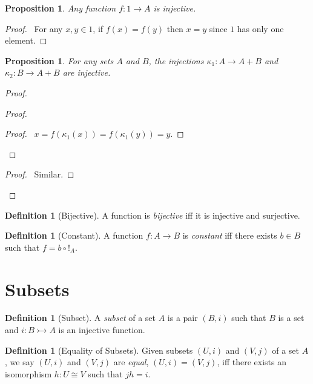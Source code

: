 \documentclass{book}
\let\qed\relax
\newtheorem{prop}[ax]{Proposition}
\theoremstyle{definition}
\newtheorem{df}[ax]{Definition}
\begin{document}
\begin{prop}
Any function $f : 1 \rightarrow A$ is injective.
\end{prop}

\begin{proof}
\pf\ For any $x,y \in 1$, if $f(x) = f(y)$ then $x = y$ since $1$ has only one element. \qed
\end{proof}

\begin{prop}
For any sets $A$ and $B$, the injections $\kappa_1 : A \rightarrow A + B$ and $\kappa_2 : B \rightarrow A + B$ are injective.
\end{prop}

\begin{proof}
\pf
{}
\begin{proof}
	\begin{proof}
		\pf\ $x = f(\kappa_1(x)) = f(\kappa_1(y)) = y$.
	\end{proof}
\end{proof}
\begin{proof}
	\pf\ Similar.
\end{proof}
\qed
\end{proof}

\begin{df}[Bijective]
A function is \emph{bijective} iff it is injective and surjective.
\end{df}

\begin{df}[Constant]
A function $f : A \rightarrow B$ is \emph{constant} iff there exists $b \in B$ such that $f = b \circ !_A$.
\end{df}

\section{Subsets}

\begin{df}[Subset]
A \emph{subset} of a set $A$ is a pair $(B,i)$ such that $B$ is a set and $i : B \rightarrowtail A$ is an injective function.
\end{df}

\begin{df}[Equality of Subsets]
Given subsets $(U,i)$ and $(V,j)$ of a set $A$, we say $(U,i)$ and $(V,j)$ are \emph{equal}, $(U,i) = (V,j)$, iff there exists an isomorphism $h : U \cong V$ such that $jh = i$.
\end{df}
\end{document}
